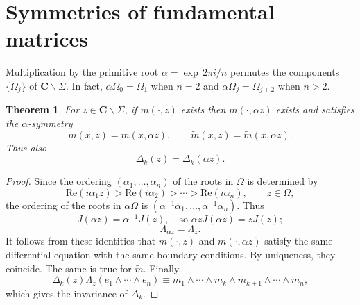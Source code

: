 \documentclass{surv-l}
\theoremstyle{plain}
\newtheorem{theorem}{Theorem}[section]
\theoremstyle{definition}
\numberwithin{equation}{chapter}
\begin{document}
\section{Symmetries of fundamental matrices}
Multiplication by the primitive root $\alpha=\exp\, 2\pi i/n$ permutes the components $\{\Omega_{j}\}$ of $ \mathbf{C}\backslash \Sigma$. In fact, $\alpha\Omega_{0}=\Omega_{1}$ when $n=2$ and $\alpha\Omega_{j}=\Omega_{j+2}$ when $n>2$.
\setcounter{theorem}{0}
\begin{theorem}\label{thm9.1} For $z\in \mathbf{C}\backslash \Sigma$, if $m(\cdot,z)$ exists then $m(\cdot,\alpha z)$ exists and satisfies the $\alpha$-symmetry
\begin{equation*}
m(x,z) = m(x, \alpha z),\qquad\tilde{m}(x, z) = \tilde{m}(x,\alpha z).
\end{equation*}
Thus also
\begin{equation*}
\Delta_{k}(z)=\Delta_{k}(\alpha z).
\end{equation*}
\end{theorem}

\begin{proof} Since the ordering $(\alpha_{1},\ldots,\alpha_{n})$ of the roots in $\Omega$ is determined by
\setcounter{equation}{1}
\begin{equation}\label{eq9.2}
\mathrm{Re}(i\alpha_{1}z) > \mathrm{Re}(i\alpha_{2}) > \cdots > \mathrm{Re}(i\alpha_{n}),\qquad z\in\Omega,
\end{equation}
the ordering of the roots in $\alpha\Omega$ is $(\alpha^{-1}\alpha_{1}, \ldots, \alpha^{-1}\alpha_{n})$. Thus
\begin{equation}\label{eq9.3}
J(\alpha z)=\alpha^{-1}J(z),\quad \text{so } \alpha zJ(\alpha z) = zJ(z);
\end{equation}
\begin{equation}\label{eq9.4}
\Lambda_{\alpha z}=\Lambda_{z}.
\end{equation}
It follows from these identities that $m(\cdot, z)$ and $m(\cdot, \alpha z)$ satisfy the same differential equation with the same boundary conditions. By uniqueness, they coincide. The same is true for $\tilde{m}$. Finally,
\begin{equation*}
\Delta_{k}(z)\Lambda_{z}(e_{1}\wedge\cdots\wedge e_{n})\equiv m_{1}\wedge\cdots \wedge m_{k}\wedge\tilde{m}_{k+1}\wedge\cdots \wedge\tilde{m}_{n},
\end{equation*}
which gives the invariance of $\Delta_{k}$.
\end{proof}
\end{document}
